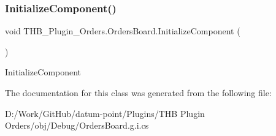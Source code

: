 \subsubsection{\texorpdfstring{Initialize\+Component()}{InitializeComponent()}\hspace{0.1cm}{\footnotesize\ttfamily [2/2]}}
{\footnotesize\ttfamily void T\+H\+B\+\_\+\+Plugin\+\_\+\+Orders.\+Orders\+Board.\+Initialize\+Component (\begin{DoxyParamCaption}{ }\end{DoxyParamCaption})}



Initialize\+Component 



The documentation for this class was generated from the following file\+:\begin{DoxyCompactItemize}
\item 
D\+:/\+Work/\+Git\+Hub/datum-\/point/\+Plugins/\+T\+H\+B Plugin Orders/obj/\+Debug/Orders\+Board.\+g.\+i.\+cs\end{DoxyCompactItemize}
